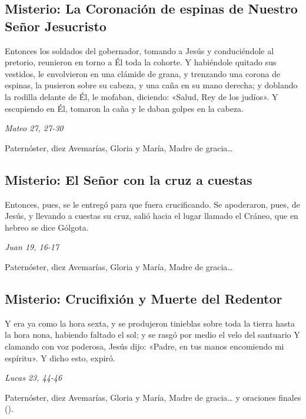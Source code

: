 \documentclass[./rosary.tex]{subfiles}
\newcounter{sorrowful-counter}
\begin{document}
\bigskip

\subsection*{ Misterio: La Coronación de espinas de Nuestro Señor Jesucristo}

Entonces los soldados del gobernador, tomando a Jesús y conduciéndole al pretorio,
reunieron en torno a Él toda la cohorte. Y habiéndole quitado sus vestidos, le envolvieron en una clámide de grana,
y trenzando una corona de espinas, la pusieron sobre su cabeza, y una caña en su mano derecha;
y doblando la rodilla delante de Él, le mofaban, diciendo: «Salud, Rey de los judíos».
Y escupiendo en Él, tomaron la caña y le daban golpes en la cabeza.

\begin{flushright}
      \emph{Mateo 27, 27-30}
\end{flushright}

Paternóster, diez Avemarías, Gloria y María, Madre de gracia{\ldots}

\bigskip

\subsection*{ Misterio: El Señor con la cruz a cuestas}

Entonces, pues, se le entregó para que fuera crucificando. Se apoderaron, pues, de Jesús,
y llevando a cuestas su cruz, salió hacia el lugar llamado el Cráneo, que en hebreo se dice Gólgota.

\begin{flushright}
      \emph{Juan 19, 16-17}
\end{flushright}

Paternóster, diez Avemarías, Gloria y María, Madre de gracia{\ldots}

\bigskip

\bigskip

\subsection*{ Misterio: Crucifixión y Muerte del Redentor}

Y era ya como la hora sexta, y se produjeron tinieblas sobre toda la tierra hasta la hora nona,
habiendo faltado el sol; y se rasgó por medio el velo del santuario Y clamando con voz poderosa,
Jesús dijo: «Padre, en tus manos encomiendo mi espíritu». Y dicho esto, expiró.

\begin{flushright}
      \emph{Lucas 23, 44-46}
\end{flushright}

Paternóster, diez Avemarías, Gloria y María, Madre de gracia{\ldots} y oraciones finales ().
\end{document}
